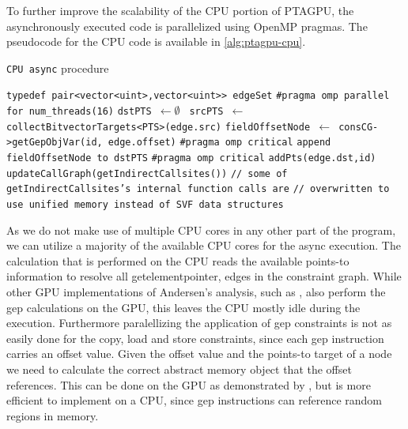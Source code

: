 To further improve the scalability of the CPU portion of PTAGPU, the asynchronously executed code is parallelized using OpenMP pragmas.
The pseudocode for the CPU code is available in \autoref{alg:ptagpu-cpu}.
\begin{algorithm}
    \caption[CPU Async Procedure Pseudocode]{\texttt{CPU async} procedure}\label{alg:ptagpu-cpu}
    \begin{algorithmic}
        \State \texttt{typedef pair<vector<uint>,vector<uint>> edgeSet} 
        \State \texttt{\#pragma omp parallel for num\_threads(16)}
        \State \texttt{dstPTS $\leftarrow \emptyset$ }
        \State \texttt{srcPTS $\leftarrow$ collectBitvectorTargets<PTS>(edge.src)}
        \State \texttt{fieldOffsetNode $\leftarrow$ consCG->getGepObjVar(id, edge.offset)}
        \State \texttt{\#pragma omp critical} 
        \State \texttt{append fieldOffsetNode to dstPTS}
        \EndFor
        \State \texttt{\#pragma omp critical}
        \State \texttt{addPts(edge.dst,id)}
        \EndFor
        \EndFor
        \State \texttt{updateCallGraph(getIndirectCallsites())} 
        \State \texttt{// some of getIndirectCallsites's internal function calls are}
        \State \texttt{// overwritten to use unified memory instead of SVF data structures}
        \EndProcedure
    \end{algorithmic}
\end{algorithm}
As we do not make use of multiple CPU cores in any other part of the program, we can utilize a majority of the available CPU cores for the async execution.
The calculation that is performed on the CPU reads the available points-to information to resolve all getelementpointer, edges in the constraint graph.
While other GPU implementations of Andersen's analysis, such as \cite{mendez2012gpu}, also perform the gep calculations on the GPU, this leaves the CPU mostly idle during the execution.
Furthermore paralellizing the application of gep constraints is not as easily done for the copy, load and store constraints, since each gep instruction carries an offset value. Given the offset value and the points-to target of a node we need to calculate the correct abstract memory object that the offset references. This can be done on the GPU as demonstrated by \cite{mendez2012gpu}, but is more efficient to implement on a CPU, since gep instructions can reference random regions in memory.

